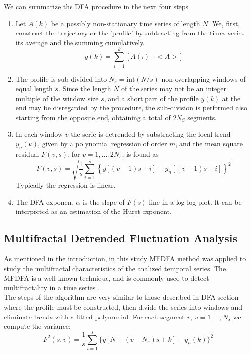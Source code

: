 \documentclass[onecolumn, preprint,aps,amsmath, amssymb, superscriptaddress]{revtex4}
\begin{document}
We can summarize the DFA procedure in the next four steps

\begin{enumerate}
\item Let $A(k)$ be a possibly non-stationary time series of length $N$. We, first, construct the trajectory or the 'profile' by subtracting from the times series its average and the summing cumulatively.
\begin{equation}
y(k) = \sum_{i=1}^{k}[A(i)-<A>]
\label{profile}
\end{equation} 
\item The profile is sub-divided into $N_s=\text{int}(N/s)$ non-overlapping windows of equal length $s$. Since the length $N$ of the series may not be an integer multiple of the window size $s$, and a short part of the profile $y(k)$ at the end may be disregarded by the procedure, the sub-division is performed also starting from the opposite end, obtaining a total of $2N_S$ segments.

\item In each window $v$ the serie is detrended by substracting the local trend $y_n(k)$, given by a polynomial regression of order $m$,  and the mean square residual $F(v,s)$, for $v=1,\dots,2N_s$, is found as
\begin{equation}
F(v,s) = \sqrt{\dfrac{1}{s}\displaystyle\sum_{i=1}^{s}\left\lbrace y[(v-1)s+i]-y_n[(v-1)s+i]\right\rbrace^2}
\end{equation}
Typically the regression is linear.  
\item The DFA exponent $\alpha$ is the slope of $F(s)$ line in a log-log plot. It can be interpreted as an estimation of the Hurst exponent.
\end{enumerate}

\subsection{Multifractal Detrended Fluctuation Analysis}

As mentioned in the introduction, in this study MFDFA method was applied to study the multifractal characteristics of the analized temporal series. The MFDFA is a well-known technique, and is commonly used to detect multifractality in a time series \cite{Kantelhardt}. \\
The steps of the algorithm are very similar to those described in DFA section where the profile must be constructed, then divide the series into windows and eliminate trends with a fitted polynomial. For each segment $v$, $v=1,\ldots,N_s$  we compute the variance:
\begin{equation}
 	F^2 (s,v)=\frac{1}{s} \sum_{i=1}^s\{y[N-(v-N_s )s+k]-y_n (k)\}^2
 	\label{eq:var2}
\end{equation}
\end{document}
